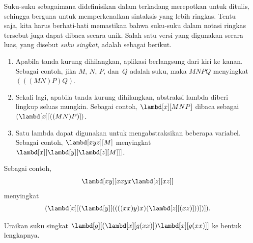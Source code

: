 \documentclass[../../../include/open-logic-section]{subfiles}
\begin{document}

Suku-suku sebagaimana didefinisikan dalam  terkadang
merepotkan untuk ditulis, sehingga berguna untuk memperkenalkan sintaksis yang
lebih ringkas. Tentu saja, kita harus berhati-hati memastikan bahwa suku-suku
dalam notasi ringkas tersebut juga dapat dibaca secara unik. Salah satu versi
yang digunakan secara luas, yang disebut \emph{suku singkat}, adalah sebagai
berikut.

\begin{enumerate}
\item Apabila tanda kurung dihilangkan, aplikasi berlangsung dari kiri ke
  kanan. Sebagai contoh, jika $M$, $N$, $P$, dan~$Q$ adalah suku, maka $MNPQ$
  menyingkat $(((MN)P)Q)$.
\item Sekali lagi, apabila tanda kurung dihilangkan, abstraksi lambda diberi
  lingkup seluas mungkin. Sebagai contoh, $\lambd[x][MNP]$ dibaca sebagai
  $(\lambd[x][((MN)P)])$.
\item Satu lambda dapat digunakan untuk mengabstraksikan beberapa variabel.
  Sebagai contoh, $\lambd[xyz][M]$ menyingkat
  $\lambd[x][\lambd[y][\lambd[z][M]]]$.
\end{enumerate}

Sebagai contoh,
\[
\lambd[xy][xxyx \lambd[z][xz]]
\]
menyingkat
\[
(\lambd[x][(\lambd[y][((((xx)y)x)(\lambd[z][(xz)]))])]).
\]

\begin{prob}
Uraikan suku singkat $\lambd[g][(\lambd[x][g (x x)])
  \lambd[x][g (x x)]]$ ke bentuk lengkapnya.
\end{prob}
\end{document}

